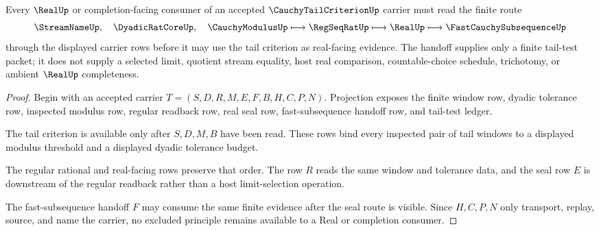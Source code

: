 \begin{theorem}
\label{thm:cauchy-tail-criterion-real-seal-handoff}
Every $\RealUp$ or completion-facing consumer of an accepted $\CauchyTailCriterionUp$ carrier must read the finite route
$$
\StreamNameUp,\quad \DyadicRatCoreUp,\quad \CauchyModulusUp
\longmapsto
\RegSeqRatUp
\longmapsto
\RealUp
\longmapsto
\FastCauchySubsequenceUp
$$
through the displayed carrier rows before it may use the tail criterion as real-facing evidence. The handoff supplies only a finite tail-test packet; it does not supply a selected limit, quotient stream equality, host real comparison, countable-choice schedule, trichotomy, or ambient $\RealUp$ completeness.
\end{theorem}
\begin{proof}
Begin with an accepted carrier $T=(S,D,R,M,E,F,B,H,C,P,N)$. Projection exposes the finite window row, dyadic tolerance row, inspected modulus row, regular readback row, real seal row, fast-subsequence handoff row, and tail-test ledger.

The tail criterion is available only after $S,D,M,B$ have been read. These rows bind every inspected pair of tail windows to a displayed modulus threshold and a displayed dyadic tolerance budget.

The regular rational and real-facing rows preserve that order. The row $R$ reads the same window and tolerance data, and the seal row $E$ is downstream of the regular readback rather than a host limit-selection operation.

The fast-subsequence handoff $F$ may consume the same finite evidence after the seal route is visible. Since $H,C,P,N$ only transport, replay, source, and name the carrier, no excluded principle remains available to a Real or completion consumer.
\end{proof}



